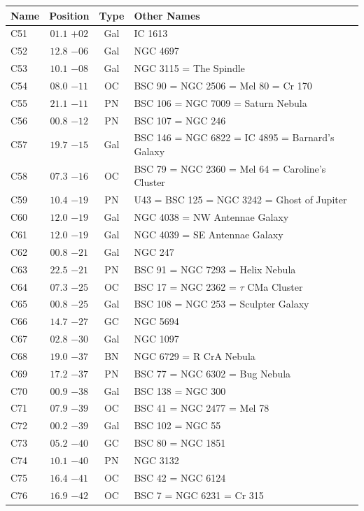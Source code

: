 \begin{table}[t]
    \setlength{\tabcolsep}{2pt}
    \footnotesize
    \begin{tabularx}{\linewidth}{lccX}
        \hline
        Name&Position&Type&Other Names\\
        \hline

C51  &$01.1$ $+02$&Gal&IC 1613\\
C52  &$12.8$ $-06$&Gal&NGC 4697\\
C53  &$10.1$ $-08$&Gal&NGC 3115 = The Spindle\\
C54  &$08.0$ $-11$&OC &BSC 90 = NGC 2506 = Mel 80 = Cr 170\\
C55  &$21.1$ $-11$&PN &BSC 106 = NGC 7009 = Saturn Nebula\\
C56  &$00.8$ $-12$&PN &BSC 107 = NGC 246\\
C57  &$19.7$ $-15$&Gal&BSC 146 = NGC 6822 = IC 4895 = Barnard's Galaxy\\
C58  &$07.3$ $-16$&OC &BSC 79 = NGC 2360 = Mel 64 = Caroline's Cluster\\
C59  &$10.4$ $-19$&PN &U43 = BSC 125 = NGC 3242 = Ghost of Jupiter\\
C60  &$12.0$ $-19$&Gal&NGC 4038 = NW Antennae Galaxy\\
C61  &$12.0$ $-19$&Gal&NGC 4039 = SE Antennae Galaxy\\
C62  &$00.8$ $-21$&Gal&NGC 247\\
C63  &$22.5$ $-21$&PN &BSC 91 = NGC 7293 = Helix Nebula\\
C64  &$07.3$ $-25$&OC &BSC 17 = NGC 2362 = $\tau$ CMa Cluster\\
C65  &$00.8$ $-25$&Gal&BSC 108 = NGC 253 = Sculpter Galaxy\\
C66  &$14.7$ $-27$&GC &NGC 5694\\
C67  &$02.8$ $-30$&Gal&NGC 1097\\
C68  &$19.0$ $-37$&BN &NGC 6729 = R CrA Nebula\\
C69  &$17.2$ $-37$&PN &BSC 77 = NGC 6302 = Bug Nebula\\
C70  &$00.9$ $-38$&Gal&BSC 138 = NGC 300\\
C71  &$07.9$ $-39$&OC &BSC 41 = NGC 2477 = Mel 78\\
C72  &$00.2$ $-39$&Gal&BSC 102 = NGC 55\\
C73  &$05.2$ $-40$&GC &BSC 80 = NGC 1851\\
C74  &$10.1$ $-40$&PN &NGC 3132\\
C75  &$16.4$ $-41$&OC &BSC 42 = NGC 6124\\
C76  &$16.9$ $-42$&OC &BSC 7 = NGC 6231 = Cr 315\\

\end{tabularx}
\end{table}

